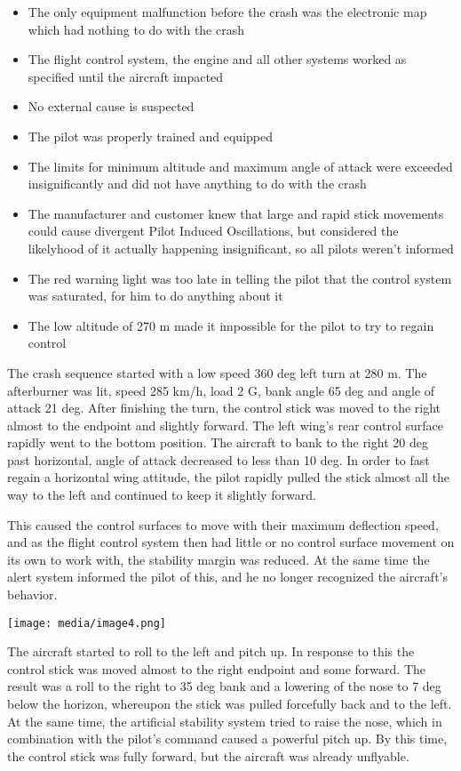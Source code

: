 \begin{itemize}
\item
  The only equipment malfunction before the crash was the electronic map
  which had nothing to do with the crash
\item
  The flight control system, the engine and all other systems worked as
  specified until the aircraft impacted
\item
  No external cause is suspected
\item
  The pilot was properly trained and equipped
\item
  The limits for minimum altitude and maximum angle of attack were
  exceeded insignificantly and did not have anything to do with the
  crash
\item
  The manufacturer and customer knew that large and rapid stick
  movements could cause divergent Pilot Induced Oscillations, but
  considered the likelyhood of it actually happening insignificant, so
  all pilots weren't informed
\item
  The red warning light was too late in telling the pilot that the
  control system was saturated, for him to do anything about it
\item
  The low altitude of 270 m made it impossible for the pilot to try to
  regain control
\end{itemize}

The crash sequence started with a low speed 360 deg left turn at 280 m.
The afterburner was lit, speed 285 km/h, load 2 G, bank angle 65 deg and
angle of attack 21 deg. After finishing the turn, the control stick was
moved to the right almost to the endpoint and slightly forward. The left
wing's rear control surface rapidly went to the bottom position. The
aircraft to bank to the right 20 deg past horizontal, angle of attack
decreased to less than 10 deg. In order to fast regain a horizontal wing
attitude, the pilot rapidly pulled the stick almost all the way to the
left and continued to keep it slightly forward.

This caused the control surfaces to move with their maximum deflection
speed, and as the flight control system then had little or no control
surface movement on its own to work with, the stability margin was
reduced. At the same time the alert system informed the pilot of this,
and he no longer recognized the aircraft's behavior.

\texttt{[image: media/image4.png]}

The aircraft started to roll to the left and pitch up. In response to
this the control stick was moved almost to the right endpoint and some
forward. The result was a roll to the right to 35 deg bank and a
lowering of the nose to 7 deg below the horizon, whereupon the stick was
pulled forcefully back and to the left. At the same time, the artificial
stability system tried to raise the nose, which in combination with the
pilot's command caused a powerful pitch up. By this time, the control
stick was fully forward, but the aircraft was already unflyable.

